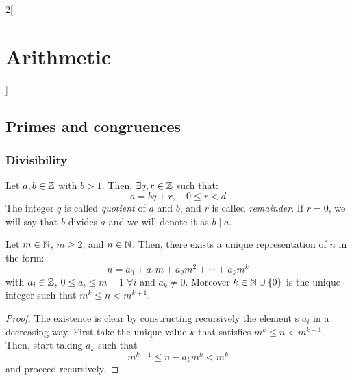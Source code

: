 \documentclass[../../../main_math.tex]{subfiles}
\begin{document}
\begin{multicols}{2}[\section{Arithmetic}]
  \subsection{Primes and congruences}
  \subsubsection{Divisibility}
  \begin{theorem}
    Let $a,b\in\mathbb{Z}$ with $b>1$. Then, $\exists q,r\in\mathbb{Z}$ such that: $$a=bq+r, \quad 0\leq r<d$$
    The integer $q$ is called \emph{quotient} of $a$ and $b$, and $r$ is called \emph{remainder}. If $r=0$, we will say that $b$ divides $a$ and we will denote it as $b\mid a$.
  \end{theorem}
  \begin{theorem}
    Let $m\in\mathbb{N}$, $m\geq 2$, and $n\in \mathbb{N}$. Then, there exists a unique representation of $n$ in the form: $$n=a_0+a_1m+a_2m^2+\cdots +a_km^k$$ with $a_i\in\mathbb{Z}$, $0\leq a_i\leq m-1$ $\forall i$ and $a_k\ne 0$. Moreover $k\in\mathbb{N}\cup\{0\}$ is the unique integer such that $m^k\leq n<m^{k+1}$.
  \end{theorem}
  \begin{proof}
    The existence is clear by constructing recursively the element s $a_i$ in a decreasing way. First take the unique value $k$ that satisfies $m^k\leq n<m^{k+1}$. Then, start taking $a_k$ such that $$m^{k-1}\leq n-a_km^k<m^{k}$$ and proceed recursively.


\end{proof}
\end{multicols}
\end{document}
